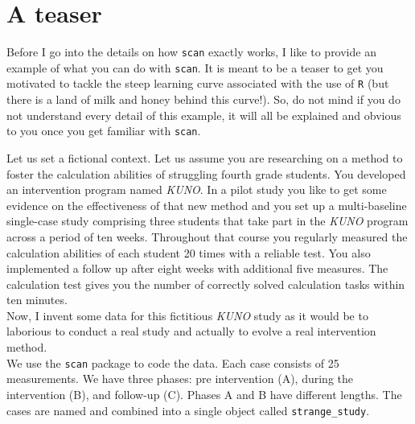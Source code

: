 \documentclass[
]{book}
\begin{document}
\hypertarget{a-teaser}{%
\section{A teaser}\label{a-teaser}}

Before I go into the details on how \texttt{scan} exactly works, I like to provide an example of what you can do with \texttt{scan}. It is meant to be a teaser to get you motivated to tackle the steep learning curve associated with the use of \texttt{R} (but there is a land of milk and honey behind this curve!). So, do not mind if you do not understand every detail of this example, it will all be explained and obvious to you once you get familiar with \texttt{scan}.

Let us set a fictional context. Let us assume you are researching on a method to foster the calculation abilities of struggling fourth grade students. You developed an intervention program named \emph{KUNO}. In a pilot study you like to get some evidence on the effectiveness of that new method and you set up a multi-baseline single-case study comprising three students that take part in the \emph{KUNO} program across a period of ten weeks. Throughout that course you regularly measured the calculation abilities of each student 20 times with a reliable test. You also implemented a follow up after eight weeks with additional five measures. The calculation test gives you the number of correctly solved calculation tasks within ten minutes.\\
Now, I invent some data for this fictitious \emph{KUNO} study as it would be to laborious to conduct a real study and actually to evolve a real intervention method.\\
We use the \texttt{scan} package to code the data. Each case consists of 25 measurements. We have three phases: pre intervention (A), during the intervention (B), and follow-up (C). Phases A and B have different lengths. The cases are named and combined into a single object called \texttt{strange\_study}.
\end{document}
